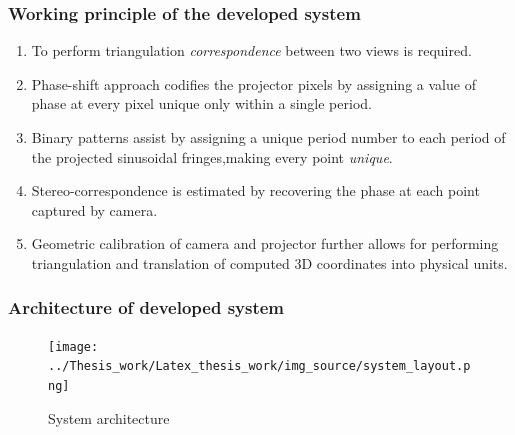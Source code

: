 \documentclass[9pt]{beamer}
\begin{document}
\begin{frame}
\frametitle{Working principle of the developed system}
\begin{enumerate}
\item To perform triangulation \textit{correspondence} between two views is required.
\item Phase-shift approach codifies the projector pixels by assigning a value of phase at every pixel unique only within a single period.
\item Binary patterns assist by assigning a unique period number to each period of the projected sinusoidal fringes,making every point \textit{unique}.
\item Stereo-correspondence is estimated by recovering the phase at each point captured by camera.
\item Geometric calibration of camera and projector further allows for performing triangulation and translation of computed 3D coordinates into physical units.  
\end{enumerate} 
\begin{figure}
\hspace{-1.5cm}
\hspace{1cm}
\end{figure}
\end{frame}

\begin{frame}
\frametitle{Architecture of developed system}
\begin{figure}
\texttt{[image: ../Thesis\_work/Latex\_thesis\_work/img\_source/system\_layout.png]}
\caption{System architecture}
\end{figure}
\end{frame}
\end{document}
